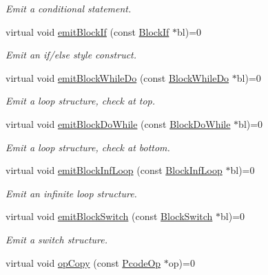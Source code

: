 \begin{DoxyCompactItemize}
\begin{DoxyCompactList}\small\item\em Emit a conditional statement. \end{DoxyCompactList}\item 
virtual void \mbox{\hyperlink{class_print_language_a33097042b2594c6397b3ced31a3f31b2}{emit\+Block\+If}} (const \mbox{\hyperlink{class_block_if}{Block\+If}} $\ast$bl)=0
\begin{DoxyCompactList}\small\item\em Emit an if/else style construct. \end{DoxyCompactList}\item 
virtual void \mbox{\hyperlink{class_print_language_a642b7bac95ba3e7627f89cbc87ea0dc7}{emit\+Block\+While\+Do}} (const \mbox{\hyperlink{class_block_while_do}{Block\+While\+Do}} $\ast$bl)=0
\begin{DoxyCompactList}\small\item\em Emit a loop structure, check at top. \end{DoxyCompactList}\item 
virtual void \mbox{\hyperlink{class_print_language_a43bee19adc9bc933d1bd5845d614dc74}{emit\+Block\+Do\+While}} (const \mbox{\hyperlink{class_block_do_while}{Block\+Do\+While}} $\ast$bl)=0
\begin{DoxyCompactList}\small\item\em Emit a loop structure, check at bottom. \end{DoxyCompactList}\item 
virtual void \mbox{\hyperlink{class_print_language_a2d573f9f0fc1714e084829228f35580b}{emit\+Block\+Inf\+Loop}} (const \mbox{\hyperlink{class_block_inf_loop}{Block\+Inf\+Loop}} $\ast$bl)=0
\begin{DoxyCompactList}\small\item\em Emit an infinite loop structure. \end{DoxyCompactList}\item 
virtual void \mbox{\hyperlink{class_print_language_afac6d491a5ca9e72580c74bbf87a0968}{emit\+Block\+Switch}} (const \mbox{\hyperlink{class_block_switch}{Block\+Switch}} $\ast$bl)=0
\begin{DoxyCompactList}\small\item\em Emit a switch structure. \end{DoxyCompactList}\item 
virtual void \mbox{\hyperlink{class_print_language_ab74b566887307a0b84d7a391f8500c36}{op\+Copy}} (const \mbox{\hyperlink{class_pcode_op}{Pcode\+Op}} $\ast$op)=0

\end{DoxyCompactItemize}
